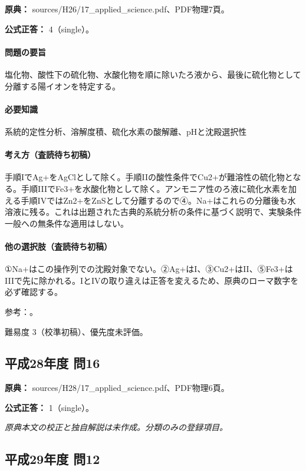 \noindent\textbf{原典：} sources/H26/17\_applied\_science.pdf、PDF物理7頁。

\textbf{公式正答：} 4（single）。

\paragraph{問題の要旨} 塩化物、酸性下の硫化物、水酸化物を順に除いたろ液から、最後に硫化物として分離する陽イオンを特定する。

\paragraph{必要知識} 系統的定性分析、溶解度積、硫化水素の酸解離、pHと沈殿選択性

\paragraph{考え方（査読待ち初稿）} 手順IでAg+をAgClとして除く。手順IIの酸性条件でCu2+が難溶性の硫化物となる。手順IIIでFe3+を水酸化物として除く。アンモニア性のろ液に硫化水素を加える手順IVではZn2+をZnSとして分離するので④。Na+はこれらの分離後も水溶液に残る。これは出題された古典的系統分析の条件に基づく説明で、実験条件一般への無条件な適用はしない。

\paragraph{他の選択肢（査読待ち初稿）} ①Na+はこの操作列での沈殿対象でない。②Ag+はI、③Cu2+はII、⑤Fe3+はIIIで先に除かれる。IとIVの取り違えは正答を変えるため、原典のローマ数字を必ず確認する。

\par 参考：\cite{qualitative_stanford}。

\par 難易度 3（校準初稿）、優先度未評価。

\subsection{平成28年度 問16}
\label{q:h28-reg-applied-16}

\noindent\textbf{原典：} sources/H28/17\_applied\_science.pdf、PDF物理6頁。

\textbf{公式正答：} 1（single）。

\par\textit{原典本文の校正と独自解説は未作成。分類のみの登録項目。}

\subsection{平成29年度 問12}
\label{q:h29-reg-applied-12}

